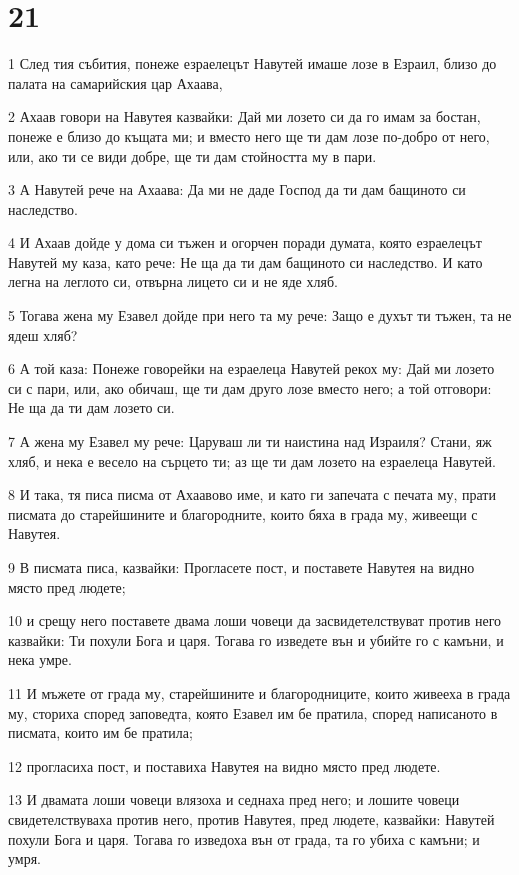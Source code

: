 \chapter{21}

\par 1 След тия събития, понеже езраелецът Навутей имаше лозе в Езраил, близо до палата на самарийския цар Ахаава,
\par 2 Ахаав говори на Навутея казвайки: Дай ми лозето си да го имам за бостан, понеже е близо до къщата ми; и вместо него ще ти дам лозе по-добро от него, или, ако ти се види добре, ще ти дам стойността му в пари.
\par 3 А Навутей рече на Ахаава: Да ми не даде Господ да ти дам бащиното си наследство.
\par 4 И Ахаав дойде у дома си тъжен и огорчен поради думата, която езраелецът Навутей му каза, като рече: Не ща да ти дам бащиното си наследство. И като легна на леглото си, отвърна лицето си и не яде хляб.
\par 5 Тогава жена му Езавел дойде при него та му рече: Защо е духът ти тъжен, та не ядеш хляб?
\par 6 А той каза: Понеже говорейки на езраелеца Навутей рекох му: Дай ми лозето си с пари, или, ако обичаш, ще ти дам друго лозе вместо него; а той отговори: Не ща да ти дам лозето си.
\par 7 А жена му Езавел му рече: Царуваш ли ти наистина над Израиля? Стани, яж хляб, и нека е весело на сърцето ти; аз ще ти дам лозето на езраелеца Навутей.
\par 8 И така, тя писа писма от Ахаавово име, и като ги запечата с печата му, прати писмата до старейшините и благородните, които бяха в града му, живеещи с Навутея.
\par 9 В писмата писа, казвайки: Прогласете пост, и поставете Навутея на видно място пред людете;
\par 10 и срещу него поставете двама лоши човеци да засвидетелствуват против него казвайки: Ти похули Бога и царя. Тогава го изведете вън и убийте го с камъни, и нека умре.
\par 11 И мъжете от града му, старейшините и благородниците, които живееха в града му, сториха според заповедта, която Езавел им бе пратила, според написаното в писмата, които им бе пратила;
\par 12 прогласиха пост, и поставиха Навутея на видно място пред людете.
\par 13 И двамата лоши човеци влязоха и седнаха пред него; и лошите човеци свидетелствуваха против него, против Навутея, пред людете, казвайки: Навутей похули Бога и царя. Тогава го изведоха вън от града, та го убиха с камъни; и умря.
